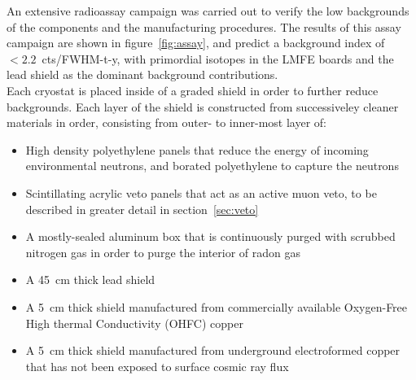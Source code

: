 \documentclass[/main.tex]{subfiles}
\begin{document}
An extensive radioassay campaign was carried out to verify the low backgrounds of the components and the manufacturing procedures\cite{mjdassay}.
The results of this assay campaign are shown in figure~\ref{fig:assay}, and predict a background index of $<2.2$~cts/FWHM-t-y, with primordial isotopes in the LMFE boards and the lead shield as the dominant background contributions.
\\
Each cryostat is placed inside of a graded shield in order to further reduce backgrounds.
Each layer of the shield is constructed from successiveley cleaner materials in order, consisting from outer- to inner-most layer of:
\begin{itemize}
\item High density polyethylene panels that reduce the energy of incoming environmental neutrons, and borated polyethylene to capture the neutrons
\item Scintillating acrylic veto panels that act as an active muon veto, to be described in greater detail in section~\ref{sec:veto}
\item A mostly-sealed aluminum box that is continuously purged with scrubbed nitrogen gas in order to purge the interior of radon gas
\item A 45~cm thick lead shield
\item A 5~cm thick shield manufactured from commercially available Oxygen-Free High thermal Conductivity (OHFC) copper
\item A 5~cm thick shield manufactured from underground electroformed copper that has not been exposed to surface cosmic ray flux
\end{itemize}
\end{document}
